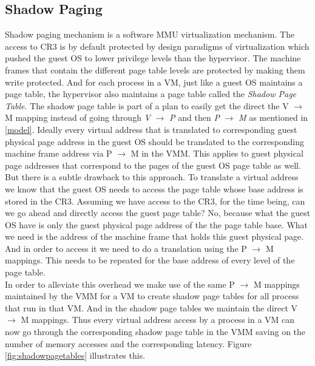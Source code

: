 \subsection{Shadow Paging} \label{sp}
Shadow paging mechanism is a software MMU virtualization mechanism.
The access to CR3 is by default protected by design paradigms of virtualization which pushed the
guest OS to lower privilege levels than the hypervisor. The machine frames that contain the
different page table levels are protected by making them write protected. And for each
process in a VM, just like a guest OS maintains a page table, the hypervisor also maintains a page
table called the \textit{Shadow Page Table}. The shadow page table is part of a plan to easily get
the direct the V $\rightarrow$ M mapping instead of going through \textit{V} $\rightarrow$
\textit{P} and then \textit{P} $\rightarrow$ \textit{M} as mentioned in \ref{model}. Ideally every
virtual address that is translated to corresponding guest physical page address in the guest OS
should be translated to the corresponding machine frame address via P $\rightarrow$ M in the VMM.
This applies to guest physical page addresses that correspond to the pages of the guest OS page
table as well. But there is a subtle drawback to this approach. To translate a virtual address we
know that the guest OS needs to access the page table whose base address is stored in the CR3.
Assuming we have access to the CR3, for the time being, can we go ahead and directly access the
guest page table? No, because what the guest OS have is only the guest physical page address of
the the page table base. What we need is the address of the machine frame that holds this guest
physical page. And in order to access it we need to do a translation using the P $\rightarrow$ M
mappings. This needs to be repeated for the base address of every level of the page table.\\
In order to alleviate this overhead we make use of the same P $\rightarrow$ M mappings maintained
by the VMM for a VM to create shadow page tables for all process that run in that VM. And in
the shadow page tables we maintain the direct V $\rightarrow$ M mappings. Thus every virtual
address access by a process in a VM can now go through the corresponding shadow page table in the
VMM saving on the number of memory accesses and the corresponding latency. Figure
\ref{fig:shadowpagetables} illustrates this.\\
